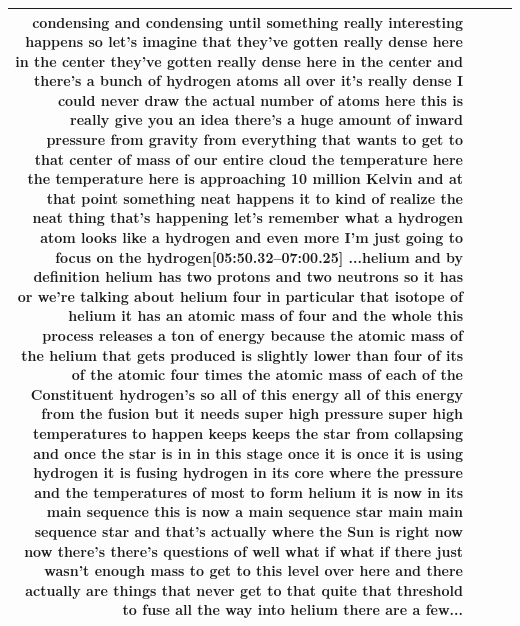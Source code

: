 \documentclass[10pt]{article}
\begin{document}
\begin{tiny}
\begin{longtable}{|r|p{0.375in}|p{1.275in}|p{3.5in}|}
condensing and condensing until something really interesting happens so let's imagine that they've gotten really dense here in the center they've gotten really dense here in the center and there's a bunch of hydrogen atoms all over it's really dense I could never draw the actual number of atoms here this is really give you an idea there's a huge amount of inward pressure from gravity from everything that wants to get to that center of mass of our entire cloud the temperature here the temperature here is approaching 10 million Kelvin and at that point something neat happens it to kind of realize the neat thing that's happening let's remember what a hydrogen atom looks like a hydrogen and even more I'm just going to focus on the hydrogen\newline\textbf{[05:50.32--07:00.25]} ...helium and by definition helium has two protons and two neutrons so it has or we're talking about helium four in particular that isotope of helium it has an atomic mass of four and the whole this process releases a ton of energy because the atomic mass of the helium that gets produced is slightly lower than four of its of the atomic four times the atomic mass of each of the Constituent hydrogen's so all of this energy all of this energy from the fusion but it needs super high pressure super high temperatures to happen keeps keeps the star from collapsing and once the star is in in this stage once it is once it is using hydrogen it is fusing hydrogen in its core where the pressure and the temperatures of most to form helium it is now in its main sequence this is now a main sequence star main main sequence star and that's actually where the Sun is right now now there's there's questions of well what if what if there just wasn't enough mass to get to this level over here and there actually are things that never get to that quite that threshold to fuse all the way into helium there are a few... \\\hline

\end{longtable}
\end{tiny}
\end{document}
